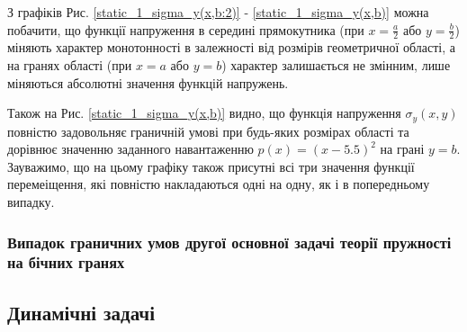 З графіків Рис. \ref{static_1_sigma_y(x,b:2)} - \ref{static_1_sigma_y(x,b)} можна побачити,
що функції напруження в середині прямокутника (при $x=\frac{a}{2}$ або $y=\frac{b}{2}$)
міняють характер монотонності в залежності від розмірів геометричної області, а на гранях області (при $x=a$ або $y=b$)
характер залишається не змінним, лише міняються абсолютні значення функцій напружень.

Також на Рис. \ref{static_1_sigma_y(x,b)} видно, що функція напруження $\sigma_y(x,y)$ повністю задовольняє граничній умові при будь-яких розмірах області
та дорівнює значенню заданного навантаженню $p(x) = (x - 5.5)^2$ на грані $y=b$.
Зауважимо, що на цьому графіку також присутні всі три значення функції перемеіщення,
які повністю накладаються одні на одну,
як і в попередньому випадку.


\subsubsection{Випадок граничних умов другої основної задачі теорії пружності на бічних гранях}



\subsection{Динамічні задачі}
